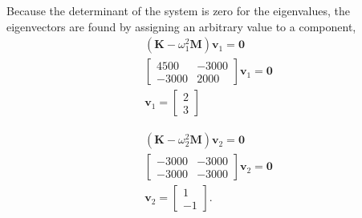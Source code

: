 \begin{Answer}[ref={two_storey}]
Because the determinant of the system is zero for the eigenvalues, the eigenvectors are found by assigning an arbitrary value to a component,
\begin{align*}
(\mathbf{K} -\omega_1^2\mathbf{M})\mathbf{v}_1 = \mathbf{0} \\
\begin{bmatrix}
    4500 & -3000 \\
    -3000 & 2000
\end{bmatrix} \mathbf{v}_1 = \mathbf{0} \\
\mathbf{v}_1 = \begin{bmatrix}
    2 \\ 3
\end{bmatrix}
\end{align*}

\begin{align*}
(\mathbf{K} -\omega_2^2\mathbf{M})\mathbf{v}_2 = \mathbf{0} \\
\begin{bmatrix}
    -3000 & -3000 \\
    -3000 & -3000
\end{bmatrix} \mathbf{v}_2 = \mathbf{0} \\
\mathbf{v}_2 = \begin{bmatrix}
    1 \\ -1
\end{bmatrix}.
\end{align*}



\end{Answer}
